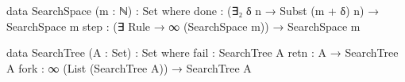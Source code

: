 \documentclass[preprint]{sigplanconf}
\begin{document}

\begin{code}
  data SearchSpace (m : ℕ) : Set where
    done : (∃₂ δ n → Subst (m + δ) n) → SearchSpace m
    step : (∃ Rule → ∞ (SearchSpace m)) → SearchSpace m
\end{code}

\begin{code}
  data SearchTree (A : Set) : Set where
    fail : SearchTree A
    retn : A → SearchTree A
    fork : ∞ (List (SearchTree A)) → SearchTree A
\end{code}
\end{document}
